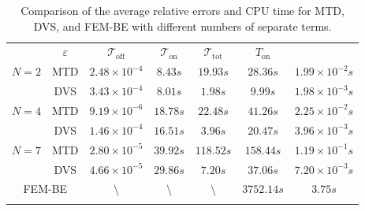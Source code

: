 \documentclass[10pt,a4paper]{article}
\numberwithin{equation}{section}
\numberwithin{lemma}{section}
\numberwithin{example}{section}
\numberwithin{definition}{section}
\numberwithin{assumption}{section}
\numberwithin{theorem}{section}
\numberwithin{proposition}{section}
\numberwithin{corollary}{section}
\numberwithin{remark}{section}
\begin{document}
\begin{table}[h]
	\centering
	\caption{Comparison of the average relative errors and CPU time for MTD, DVS, and FEM-BE with different numbers of separate terms.}
        \vspace*{2pt}
        \scriptsize
        \begin{tabular}{cc|c|c|c|c|c}
			\Xhline{1pt}
			\multicolumn{2}{c|}{\centering Algorithm}
			&
			\multicolumn{1}{c|}{\centering $\varepsilon$}
			&
			\multicolumn{1}{c|}{\centering          $\mathcal{T}_{\text{off}}$}
                &
			\multicolumn{1}{c|}{\centering $\mathcal{T}_{\text{on}}$}
                &
			\multicolumn{1}{c|}{{\centering $\mathcal{T}_{\text{tot}}$}}
            &
			\multicolumn{1}{c}{{$T_{\text{on}}$ }}
                \\ 
			\cline{1-7}	
            \multirow{2}{*}{$N=2$} 
            &
            {\centering MTD}
          &   $2.48\times10^{-4}$    &  $8.43 s$     &   $19.93s$    &   $28.36 s$&  $1.99\times10^{-2}s$\\
          \cline{3-7}
      &{\centering DVS}&  $3.43\times10^{-4}$   &   $8.01 s$ &  $1.98s$   &   $9.99 s$  &  $1.98\times10^{-3}s$\\
      \cline{1-7}
             \multirow{2}{*}{$N=4$} 
            &
            {\centering MTD}
          &   $9.19\times10^{-6}$    &  $18.78 s$     &   $22.48s$    &   $41.26 s$&  $2.25\times10^{-2}s$\\
          \cline{3-7}
      &{\centering DVS}&  $1.46\times10^{-4}$   &   $16.51 s$ &  $3.96s$   &   $20.47 s$  &  $3.96\times10^{-3}s$\\  
      \cline{1-7}
           \multirow{2}{*}{$N=7$} 
            &
            {\centering MTD}
          &   $2.80\times10^{-5}$    &  $39.92 s$     &   $118.52s$    &   $158.44 s$&  $1.19\times10^{-1}s$\\
          \cline{3-7}
      &{\centering DVS}&  $4.66\times10^{-5}$   &   $29.86 s$ &  $7.20s$   &   $37.06s$  &  $7.20\times10^{-3}s$  \\
      \cline{1-7}
    \multicolumn{2}{c|}{\centering FEM-BE} & $\setminus $ & $\setminus $ & $\setminus $ &$3752.14s $&$3.75s $\\
	\Xhline{1pt}
		\end{tabular}
	\label{table.1}
    \end{table}
\end{document}
